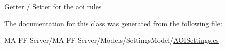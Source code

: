 Getter / Setter for the aoi rules 



The documentation for this class was generated from the following file\+:\begin{DoxyCompactItemize}
\item 
M\+A-\/\+F\+F-\/\+Server/\+M\+A-\/\+F\+F-\/\+Server/\+Models/\+Settings\+Model/\hyperlink{_a_o_i_settings_8cs}{A\+O\+I\+Settings.\+cs}\end{DoxyCompactItemize}
